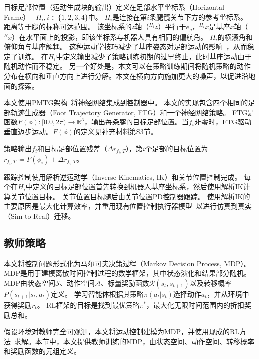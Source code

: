 \documentclass[9pt,twocolumn,twoside]{osajnl}
\begin{document}
目标足部位置（运动生成块的输出）定义在足部水平坐标系（Horizontal Frame）~\cite{barasuol2013reactive} $H_{i}, i\in \{1,2,3,4 \}$中。
$H_i$是连接在第$i$条腿髋关节下方的参考坐标系。
距离等于腿的标称可达范围。
该坐标系的$z$轴（$^{H_i}z$）平行于$e_g$，$^{H_i}x$是基座$x$轴（$^{B}x$）在水平面上的投影，即该坐标系与机器人具有相同的偏航角。
$H_i$的横滚角和俯仰角与基座解耦。
这种运动学技巧减少了基座姿态对足部运动的影响~\cite{barasuol2013reactive}，从而稳定了训练。
在$H_i$中定义输出减少了策略训练初期的过早终止，此时基座运动由于随机动作而不稳定。
另一个好处是，本文可以在策略训练期间将随机策略的动作分布在横向和垂直方向上进行分解。本文在横向方向施加更大的噪声，以促进沿地面的探索。

本文使用PMTG架构~\cite{iscen2018policies}将神经网络集成到控制器中。
本文的实现包含四个相同的足部轨迹生成器（Foot Trajectory Generator, FTG）和一个神经网络策略。
FTG是函数$F(\phi): [0.0, 2\pi) \rightarrow \mathbb{R}^3$，输出每条腿的目标足部位置。当$f_i$非零时，FTG驱动垂直迈步运动。$F(\phi)$的定义见补充材料第S3节。

策略输出$f_i$和目标足部位置残差（$\Delta {r}_{f_i,T}$），第$i$个足部的目标位置为$r_{f_i,T} \coloneqq F(\phi_i) + \Delta{r}_{f_i,T}$。

跟踪控制使用解析逆运动学（Inverse Kinematics, IK）和关节位置控制完成。
每个在$H_i$中定义的目标足部位置首先转换到机器人基座坐标系，然后使用解析IK计算关节位置目标。
关节位置目标随后由关节位置PD控制器跟踪。
使用解析IK的主要原因是最大化计算效率，并重用现有位置控制执行器模型~\cite{hwangbo2016probabilistic,lee2019robust}以进行仿真到真实（Sim-to-Real）迁移。

\subsection*{教师策略}

本文将控制问题形式化为马尔可夫决策过程（Markov Decision Process, MDP）。
MDP是用于建模离散时间控制过程的数学框架，其中状态演化和结果部分随机。
MDP由状态空间$\mathcal{S}$、动作空间$\mathcal{A}$、标量奖励函数$\mathcal{R}(s_t, s_{t+1})$以及转移概率$P(s_{t+1} | s_t, a_t)$定义。
学习智能体根据其策略$\pi(a_t|s_t)$选择动作$a_t$，并从环境中获得奖励$r_t$。
RL框架的目标是找到最优策略$\pi^*$，最大化无限时间范围内的折扣奖励总和。

假设环境对教师完全可观测，本文将运动控制建模为MDP，并使用现成的RL方法~\cite{schulman2015trust}求解。本节中，本文提供教师训练的MDP，由状态空间、动作空间、转移概率和奖励函数的元组定义。
\end{document}
